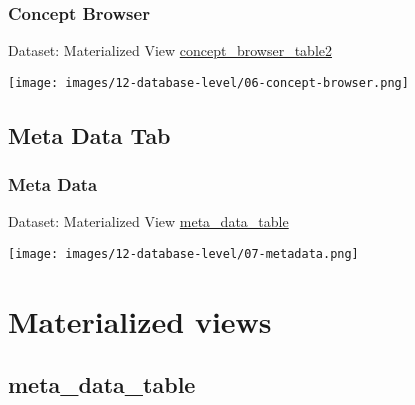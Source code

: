 \documentclass[
]{book}
\begin{document}
\hypertarget{concept-browser-1}{%
\subsubsection*{Concept Browser}\label{concept-browser-1}}

Dataset: Materialized View \href{materialized-views-1.html\#concept_browser_table2}{concept\_browser\_table2}

\texttt{[image: images/12-database-level/06-concept-browser.png]}

\hypertarget{meta-data-tab}{%
\subsection*{Meta Data Tab}\label{meta-data-tab}}

\hypertarget{meta-data-1}{%
\subsubsection*{Meta Data}\label{meta-data-1}}

Dataset: Materialized View \href{materialized-views-1.html\#meta_data_table}{meta\_data\_table}

\texttt{[image: images/12-database-level/07-metadata.png]}

\hypertarget{materialized-views-1}{%
\section{Materialized views}\label{materialized-views-1}}

\hypertarget{meta_data_table}{%
\subsection*{meta\_data\_table}\label{meta_data_table}}
\end{document}
